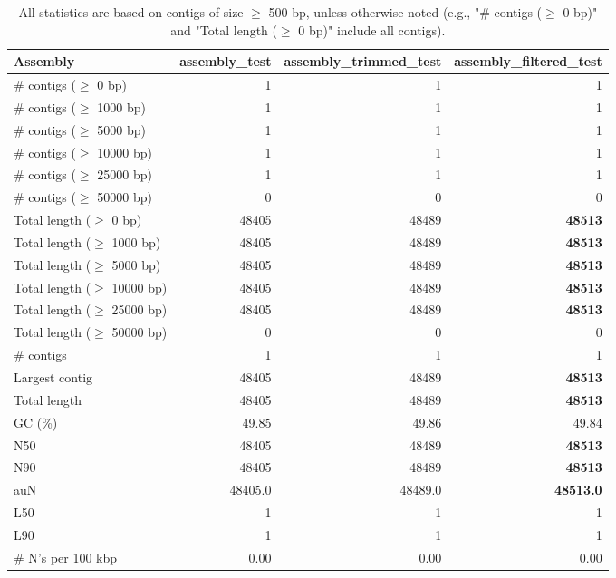 \documentclass[12pt,a4paper]{article}
\begin{document}
\begin{table}[ht]
\begin{center}
\caption{All statistics are based on contigs of size $\geq$ 500 bp, unless otherwise noted (e.g., "\# contigs ($\geq$ 0 bp)" and "Total length ($\geq$ 0 bp)" include all contigs).}
\begin{tabular}{|l*{3}{|r}|}
\hline
Assembly & assembly\_test & assembly\_trimmed\_test & assembly\_filtered\_test \\ \hline
\# contigs ($\geq$ 0 bp) & 1 & 1 & 1 \\ \hline
\# contigs ($\geq$ 1000 bp) & 1 & 1 & 1 \\ \hline
\# contigs ($\geq$ 5000 bp) & 1 & 1 & 1 \\ \hline
\# contigs ($\geq$ 10000 bp) & 1 & 1 & 1 \\ \hline
\# contigs ($\geq$ 25000 bp) & 1 & 1 & 1 \\ \hline
\# contigs ($\geq$ 50000 bp) & 0 & 0 & 0 \\ \hline
Total length ($\geq$ 0 bp) & 48405 & 48489 & {\bf 48513} \\ \hline
Total length ($\geq$ 1000 bp) & 48405 & 48489 & {\bf 48513} \\ \hline
Total length ($\geq$ 5000 bp) & 48405 & 48489 & {\bf 48513} \\ \hline
Total length ($\geq$ 10000 bp) & 48405 & 48489 & {\bf 48513} \\ \hline
Total length ($\geq$ 25000 bp) & 48405 & 48489 & {\bf 48513} \\ \hline
Total length ($\geq$ 50000 bp) & 0 & 0 & 0 \\ \hline
\# contigs & 1 & 1 & 1 \\ \hline
Largest contig & 48405 & 48489 & {\bf 48513} \\ \hline
Total length & 48405 & 48489 & {\bf 48513} \\ \hline
GC (\%) & 49.85 & 49.86 & 49.84 \\ \hline
N50 & 48405 & 48489 & {\bf 48513} \\ \hline
N90 & 48405 & 48489 & {\bf 48513} \\ \hline
auN & 48405.0 & 48489.0 & {\bf 48513.0} \\ \hline
L50 & 1 & 1 & 1 \\ \hline
L90 & 1 & 1 & 1 \\ \hline
\# N's per 100 kbp & 0.00 & 0.00 & 0.00 \\ \hline
\end{tabular}
\end{center}
\end{table}
\end{document}
